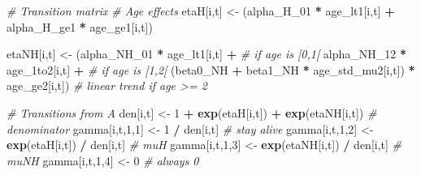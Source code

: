 \documentclass[
  12pt,
]{krantz}
\newenvironment{Shaded}{\begin{snugshade}}{\end{snugshade}}
\newcommand{\CommentTok}[1]{\textcolor[rgb]{0.56,0.35,0.01}{\textit{#1}}}
\newcommand{\DecValTok}[1]{\textcolor[rgb]{0.00,0.00,0.81}{#1}}
\newcommand{\FunctionTok}[1]{\textcolor[rgb]{0.13,0.29,0.53}{\textbf{#1}}}
\newcommand{\NormalTok}[1]{#1}
\newcommand{\OtherTok}[1]{\textcolor[rgb]{0.56,0.35,0.01}{#1}}
\newcommand{\SpecialCharTok}[1]{\textcolor[rgb]{0.81,0.36,0.00}{\textbf{#1}}}
\begin{document}
\begin{Shaded}
\begin{Highlighting}[]
\CommentTok{\# Transition matrix}
\CommentTok{\# Age effects}
\NormalTok{etaH[i,t] }\OtherTok{\textless{}{-}}\NormalTok{ (alpha\_H\_01 }\SpecialCharTok{*}\NormalTok{ age\_lt1[i,t] }\SpecialCharTok{+}\NormalTok{ alpha\_H\_ge1 }\SpecialCharTok{*}\NormalTok{ age\_ge1[i,t])}

\NormalTok{etaNH[i,t] }\OtherTok{\textless{}{-}}\NormalTok{ (alpha\_NH\_01 }\SpecialCharTok{*}\NormalTok{ age\_lt1[i,t] }\SpecialCharTok{+}                               \CommentTok{\# if age is [0,1[}
\NormalTok{                 alpha\_NH\_12 }\SpecialCharTok{*}\NormalTok{ age\_1to2[i,t] }\SpecialCharTok{+}                            \CommentTok{\# if age is [1,2[}
\NormalTok{                 (beta0\_NH }\SpecialCharTok{+}\NormalTok{ beta1\_NH }\SpecialCharTok{*}\NormalTok{ age\_std\_mu2[i,t]) }\SpecialCharTok{*}\NormalTok{ age\_ge2[i,t]) }\CommentTok{\# linear trend if age \textgreater{}= 2}

\CommentTok{\# Transitions from A}
\NormalTok{den[i,t] }\OtherTok{\textless{}{-}} \DecValTok{1} \SpecialCharTok{+} \FunctionTok{exp}\NormalTok{(etaH[i,t]) }\SpecialCharTok{+} \FunctionTok{exp}\NormalTok{(etaNH[i,t])  }\CommentTok{\# denominator}
\NormalTok{gamma[i,t,}\DecValTok{1}\NormalTok{,}\DecValTok{1}\NormalTok{] }\OtherTok{\textless{}{-}} \DecValTok{1} \SpecialCharTok{/}\NormalTok{ den[i,t]                    }\CommentTok{\# stay alive}
\NormalTok{gamma[i,t,}\DecValTok{1}\NormalTok{,}\DecValTok{2}\NormalTok{] }\OtherTok{\textless{}{-}} \FunctionTok{exp}\NormalTok{(etaH[i,t]) }\SpecialCharTok{/}\NormalTok{ den[i,t]       }\CommentTok{\# muH}
\NormalTok{gamma[i,t,}\DecValTok{1}\NormalTok{,}\DecValTok{3}\NormalTok{] }\OtherTok{\textless{}{-}} \FunctionTok{exp}\NormalTok{(etaNH[i,t]) }\SpecialCharTok{/}\NormalTok{ den[i,t]      }\CommentTok{\# muNH}
\NormalTok{gamma[i,t,}\DecValTok{1}\NormalTok{,}\DecValTok{4}\NormalTok{] }\OtherTok{\textless{}{-}} \DecValTok{0}                               \CommentTok{\# always 0}


\end{Highlighting}
\end{Shaded}
\end{document}
